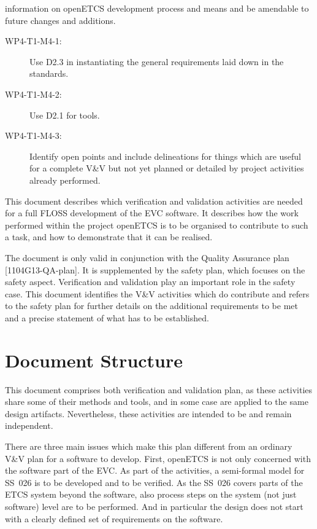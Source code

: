 \documentclass{template/openetcs_report}
\begin{document}
\begin{description}
  information on openETCS development process and means and be
  amendable to future changes and additions.
  \begin{description}
  \item[WP4-T1-M4-1:] Use D2.3 in instantiating the general
    requirements laid down in the standards.
  \item[WP4-T1-M4-2:] Use D2.1 for tools.
  \item[WP4-T1-M4-3:] Identify open points and include delineations
    for things which are useful for a complete V\&V but not yet
    planned or detailed by project activities already performed.
  \end{description}
\end{description}


This document describes which verification and validation activities
are needed for a full FLOSS development of the EVC software. It
describes how the work performed within the project openETCS is to be
organised to contribute to such a task, and how to demonstrate that it
can be realised.

The document is only valid in conjunction with the Quality Assurance
plan [1104G13-QA-plan]. It is supplemented by the safety plan, which
focuses on the safety aspect. Verification and validation play an
important role in the safety case. This document identifies the V\&V
activities which do contribute and refers to the safety plan for
further details on the additional requirements to be met and a precise
statement of what has to be established.

\section{Document Structure}
\label{sec:document-structure}

This document comprises both verification and validation plan, as
these activities share some of their methods and tools, and in some
case are applied to the same design artifacts. Nevertheless, these
activities are intended to be and remain independent.

There are three main issues which make this plan different from an
ordinary V\&V plan for a software to develop. First, openETCS is not
only concerned with the software part of the EVC. As part of the
activities, a semi-formal model for SS~026 is to be developed and to
be verified. As the SS~026 covers parts of the ETCS system beyond the
software, also process steps on the system (not just software) level
are to be performed. And in particular the design does not start with
a clearly defined set of requirements on the software.
\end{document}
